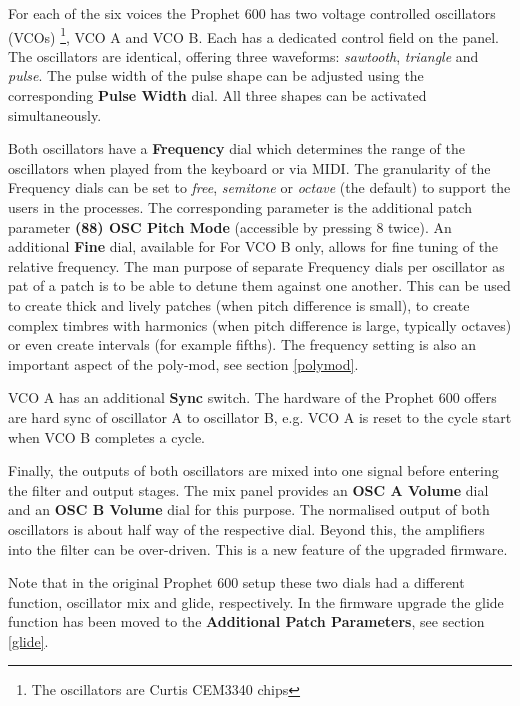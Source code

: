 For each of the six voices the Prophet 600 has two voltage controlled oscillators (VCOs) \footnote{The oscillators are Curtis CEM3340 chips}, VCO A and VCO B. Each has a dedicated control field on the panel. The oscillators are identical, offering three waveforms: \textit{sawtooth}, \textit{triangle} and \textit{pulse}. The pulse width of the pulse shape can be adjusted using the corresponding \textbf{Pulse Width} dial. All three shapes can be activated simultaneously. 

\begin{center}
\end{center}


Both oscillators have a \textbf{Frequency} dial which determines the range of the oscillators when played from the keyboard or via MIDI.  The granularity of the Frequency dials can be set to \textit{free}, \textit{semitone} or \textit{octave} (the default) to support the users in the processes. The corresponding parameter is the additional patch parameter \textbf{(88) OSC Pitch Mode} (accessible by pressing 8 twice). An additional \textbf{Fine} dial, available for For VCO B only,  allows for fine tuning of the relative frequency. The man purpose of separate Frequency dials per oscillator as pat of a patch is to be able to detune them against one another. This can be used to create thick and lively patches (when pitch difference is small), to create complex timbres with harmonics (when pitch difference is large, typically octaves) or even create intervals (for example fifths). The frequency setting is also an important aspect of the poly-mod, see section \ref{polymod}. 

VCO A has an additional \textbf{Sync} switch. The hardware of the Prophet 600 offers are hard sync of oscillator A to oscillator B, e.g. VCO A is reset to the cycle start when VCO B completes a cycle. 

Finally, the outputs of both oscillators are mixed into one signal before entering the filter and output stages. The mix panel provides an \textbf{OSC A Volume} dial and an \textbf{OSC B Volume} dial for this purpose. The normalised output of both oscillators is about half way of the respective dial. Beyond this, the amplifiers into the filter can be over-driven. This is a new feature of the upgraded firmware.

Note that in the original Prophet 600 setup these two dials had a different function, oscillator mix and glide, respectively. In the firmware upgrade the glide function has been moved to the \textbf{Additional Patch Parameters}, see section \ref{glide}. 
